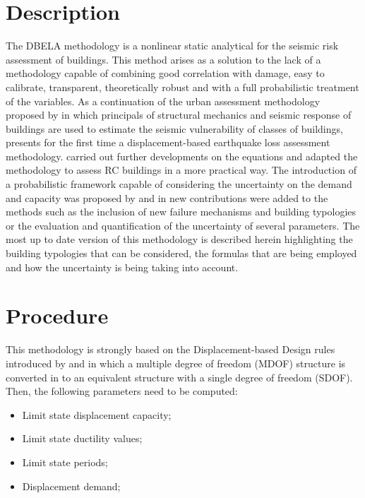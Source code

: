 \section{Description}
The DBELA methodology is a nonlinear static analytical for the seismic risk assessment of buildings. This method arises as a solution to the lack of a methodology capable of combining good correlation with damage, easy to calibrate, transparent, theoretically robust and with a full probabilistic treatment of the variables. As a continuation of the urban assessment methodology proposed by \citet{Calvi1999} in which principals of structural mechanics and seismic response of buildings are used to estimate the seismic vulnerability of classes of buildings, \citet{Pinhoetal2002} presents for the first time a displacement-based earthquake loss assessment methodology.  \citet{GlaisterPinho2003} carried out further developments on the equations and \citet{Crowleyetal2004} adapted the methodology to assess RC buildings in a more practical way. 
The introduction of a probabilistic framework capable of considering the uncertainty on the demand and capacity was proposed by \citet{Crowleyetal2006} and in \citep{Baletal2010} new contributions were added to the methods such as the inclusion of new failure mechanisms and building typologies or the evaluation and quantification of the uncertainty of several parameters.
The most up to date version of this methodology is described herein highlighting the building typologies that can be considered, the formulas that are being employed and how the uncertainty is being taking into account.

\section{Procedure}
This methodology is strongly based on the Displacement-based Design rules introduced by  \citet{Priestley1997} and \citet{Priestleyetal2007} in which a multiple degree of freedom (MDOF) structure is converted in to an equivalent structure with a single degree of freedom (SDOF). Then, the following parameters need to be computed: 

\begin{itemize}
\item Limit state displacement capacity;
\item Limit state ductility values;
\item Limit state periods;
\item Displacement demand;
\end{itemize}

